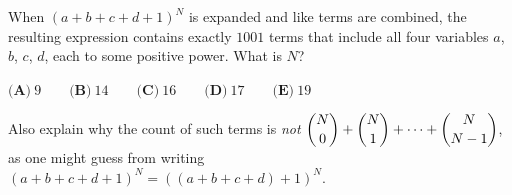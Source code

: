 When $(a+b+c+d+1)^N$ is expanded and like terms are combined, the resulting expression contains exactly $1001$ terms that include all four variables $a$, $b$, $c$, $d$, each to some positive power. What is $N$?

$\textbf{(A)}\ 9\qquad\textbf{(B)}\ 14\qquad\textbf{(C)}\ 16\qquad\textbf{(D)}\ 17\qquad\textbf{(E)}\ 19$

Also explain why the count of such terms is \emph{not} $\dbinom{N}{0}+\dbinom{N}{1}+\cdots+\dbinom{N}{N-1}$, as one might guess from writing $(a+b+c+d+1)^N=\left((a+b+c+d)+1\right)^N$.
